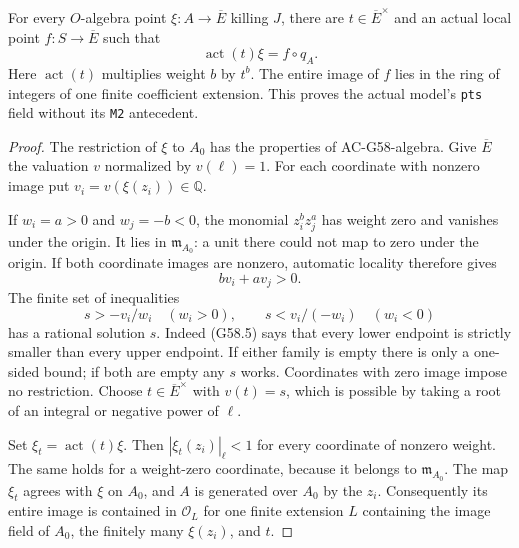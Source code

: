 \begin{theorem}
\label{AC-G58-points}
For every $O$-algebra point $\xi:A\to\overline E$
killing $J$, there are $t\in\overline E^\times$
and an actual local point $f:S\to\overline E$
such that
\[
             \operatorname{act}(t)\xi=f\circ q_A .
                                                               \tag{G58.4}
\]
Here $\operatorname{act}(t)$ multiplies weight
$b$ by $t^b$.
The entire image of $f$ lies in the ring of
integers of one finite coefficient extension.
This proves the actual model's \texttt{pts}
field without its \texttt{M2} antecedent.
\end{theorem}
\begin{proof}
The restriction of $\xi$ to $A_0$ has the
properties of AC-G58-algebra.
Give $\overline E$ the valuation $v$ normalized
by $v(\ell)=1$.
For each coordinate with nonzero image put
$v_i=v(\xi(z_i))\in\mathbb Q$.

If $w_i=a>0$ and $w_j=-b<0$, the monomial
$z_i^b z_j^a$ has weight zero and vanishes
under the origin.
It lies in $\mathfrak m_{A_0}$: a unit there
could not map to zero under the origin.
If both coordinate images are nonzero,
automatic locality therefore gives
\[
                         b v_i+a v_j>0 .
                                                               \tag{G58.5}
\]
The finite set of inequalities
\[
        s>-v_i/w_i\quad(w_i>0),\qquad
        s<v_i/(-w_i)\quad(w_i<0)
                                                               \tag{G58.6}
\]
has a rational solution $s$.
Indeed (G58.5) says that every lower endpoint
is strictly smaller than every upper endpoint.
If either family is empty there is only a
one-sided bound; if both are empty any $s$
works.  Coordinates with zero image impose
no restriction.
Choose $t\in\overline E^\times$ with $v(t)=s$,
which is possible by taking a root of an
integral or negative power of $\ell$.

Set $\xi_t=\operatorname{act}(t)\xi$.
Then $|\xi_t(z_i)|_\ell<1$ for every coordinate
of nonzero weight.
The same holds for a weight-zero coordinate,
because it belongs to $\mathfrak m_{A_0}$.
The map $\xi_t$ agrees with $\xi$ on $A_0$,
and $A$ is generated over $A_0$ by the $z_i$.
Consequently its entire image is contained
in $\mathcal O_L$ for one finite extension
$L$ containing the image field of $A_0$,
the finitely many $\xi(z_i)$, and $t$.


\end{proof}
